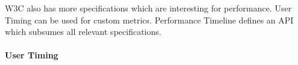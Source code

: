 






















W3C also has more specifications which are interesting for performance.
User Timing can be used for custom metrics.
Performance Timeline defines an API which subsumes all relevant specifications.


\paragraph{User Timing}




